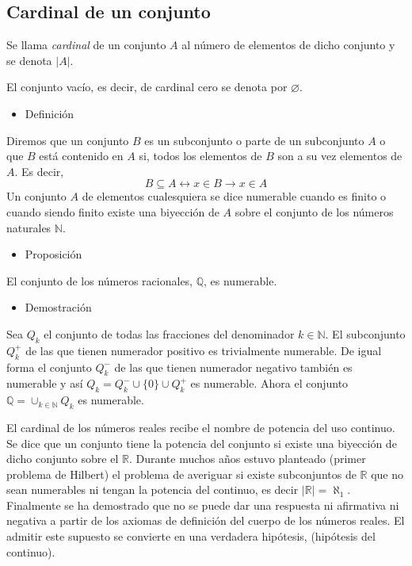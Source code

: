 \documentclass[12pt]{article}
\begin{document}
 \subsection{Cardinal de un conjunto}
 Se llama \textit{cardinal} de un conjunto $A$ al número de elementos de dicho conjunto y se denota $|A|$.
 
 El conjunto vacío, es decir, de cardinal cero se denota por $\varnothing$.
 
 \begin{itemize}[label=\color{red}\textbullet, leftmargin=*]
 	\item \color{lightblue} Definición
 \end{itemize}
 Diremos que un conjunto $B$ es un subconjunto o parte de un subconjunto $A$ o que $B$ está contenido en $A$ si, todos los elementos de $B$ son a su vez elementos de $A$. Es decir, \[ B\subseteq A\longleftrightarrow x\in B\rightarrow x\in A \]
 Un conjunto $A$ de elementos cualesquiera se dice numerable cuando es finito o cuando siendo finito existe una biyección de $A$ sobre el conjunto de los números naturales $\mathbb{N}$.
 \begin{itemize}[label=\color{red}\textbullet, leftmargin=*]
 	\item \color{lightblue}Proposición
 \end{itemize}
 El conjunto de los números racionales, $\mathbb{Q}$, es numerable.
 
 \begin{itemize}[label=\color{red}\textbullet, leftmargin=*]
 	\item \color{lightblue}Demostración
 \end{itemize}
 Sea $Q_k$  el conjunto de todas las fracciones del denominador $k\in\mathbb{N}$. El subconjunto $Q_k^+$ de las que tienen numerador positivo es trivialmente numerable. De igual forma el conjunto $Q_k^-$ de las que tienen numerador negativo también es numerable y así $Q_k=Q_k^-\cup\{0\}\cup Q_k^+$ es numerable. Ahora el conjunto $\mathbb{Q}=\cup_{k\in\mathbb{N}}Q_k$ es numerable.
 
 El cardinal de los números reales recibe el nombre de potencia del uso continuo. Se dice que un conjunto tiene la potencia del conjunto si existe una biyección de dicho conjunto sobre el $\mathbb{R}$. Durante muchos años estuvo planteado (primer problema de Hilbert) el problema de averiguar si existe subconjuntos de $\mathbb{R}$ que no sean numerables ni tengan la potencia del continuo, es decir $|\mathbb{R}|=\aleph_1$. Finalmente se ha demostrado que no se puede dar una respuesta ni afirmativa ni negativa a partir de los axiomas de definición del cuerpo de los números reales. El admitir este supuesto se convierte en una verdadera hipótesis, (hipótesis del continuo).
\end{document}
